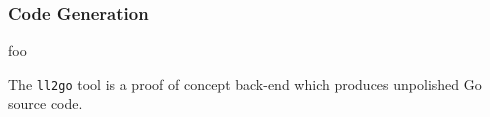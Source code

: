 
\subsubsection{Code Generation}
\label{sec:design_code_generation}


foo

The \texttt{ll2go} tool is a proof of concept back-end which produces unpolished Go source code.


